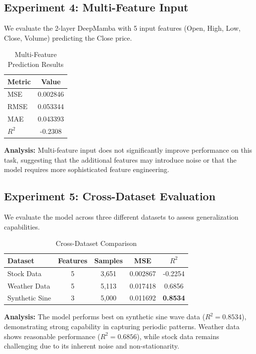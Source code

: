 \documentclass[11pt,a4paper]{article}
\begin{document}
\subsection{Experiment 4: Multi-Feature Input}

We evaluate the 2-layer DeepMamba with 5 input features (Open, High, Low, Close, Volume) predicting the Close price.

\begin{table}[H]
\centering
\caption{Multi-Feature Prediction Results}
\begin{tabular}{lc}
\toprule
\textbf{Metric} & \textbf{Value} \\
\midrule
MSE & 0.002846 \\
RMSE & 0.053344 \\
MAE & 0.043393 \\
$R^2$ & -0.2308 \\
\bottomrule
\end{tabular}
\end{table}

\textbf{Analysis:} Multi-feature input does not significantly improve performance on this task, suggesting that the additional features may introduce noise or that the model requires more sophisticated feature engineering.

\subsection{Experiment 5: Cross-Dataset Evaluation}

We evaluate the model across three different datasets to assess generalization capabilities.

\begin{table}[H]
\centering
\caption{Cross-Dataset Comparison}
\begin{tabular}{lcccc}
\toprule
\textbf{Dataset} & \textbf{Features} & \textbf{Samples} & \textbf{MSE} & \textbf{$R^2$} \\
\midrule
Stock Data & 5 & 3,651 & 0.002867 & -0.2254 \\
Weather Data & 5 & 5,113 & 0.017418 & 0.6856 \\
Synthetic Sine & 3 & 5,000 & 0.011692 & \textbf{0.8534} \\
\bottomrule
\end{tabular}
\end{table}

\textbf{Analysis:} The model performs best on synthetic sine wave data ($R^2=0.8534$), demonstrating strong capability in capturing periodic patterns. Weather data shows reasonable performance ($R^2=0.6856$), while stock data remains challenging due to its inherent noise and non-stationarity.
\end{document}
